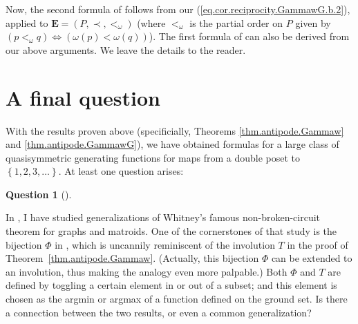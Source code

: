 \documentclass[numbers=enddot,12pt,final,onecolumn,notitlepage,abstracton]{scrartcl}%
\theoremstyle{definition}
\newtheorem{quest}[theo]{Question}
\newenvironment{question}[1][]
{\begin{quest}[#1]\begin{leftbar}}
{\end{leftbar}\end{quest}}
\newcommand{\EE}{{\mathbf{E}}}
\begin{document}
Now, the second formula of \cite[Theorem 2.13]{Joch} follows from our
(\ref{eq.cor.reciprocity.GammawG.b.2}), applied to $\EE = \left(
P,\prec,<_{\omega}\right)  $ (where $<_{\omega}$ is the partial order on $P$
given by $\left(  p<_{\omega}q\right)  \Longleftrightarrow\left(
\omega\left(  p\right)  <\omega\left(  q\right)  \right)  $). The first
formula of \cite[Theorem 2.13]{Joch} can also be derived from our above
arguments. We leave the details to the reader.

\section{A final question}

With the results proven above (specificially, Theorems
\ref{thm.antipode.Gammaw} and \ref{thm.antipode.GammawG}), we have obtained
formulas for a large class of quasisymmetric generating functions for maps
from a double poset to $\left\{  1,2,3,\ldots\right\}  $. At least one
question arises:

\begin{question}
In \cite{Gri-nbc}, I have studied generalizations of Whitney's famous
non-broken-circuit theorem for graphs and matroids. One of the cornerstones of
that study is the bijection $\Phi$ in \cite[proofs of Lemma 2.7 and Lemma
5.25]{Gri-nbc}, which is uncannily reminiscent of the involution $T$ in the proof
of Theorem~\ref{thm.antipode.Gammaw}. (Actually, this bijection $\Phi$ can be
extended to an involution, thus making the analogy even more palpable.) Both
$\Phi$ and $T$ are defined by toggling a certain element in or out of a
subset; and this element is chosen as the argmin or argmax of a function
defined on the ground set. Is there a connection between the two results, or
even a common generalization?
\end{question}
\end{document}
